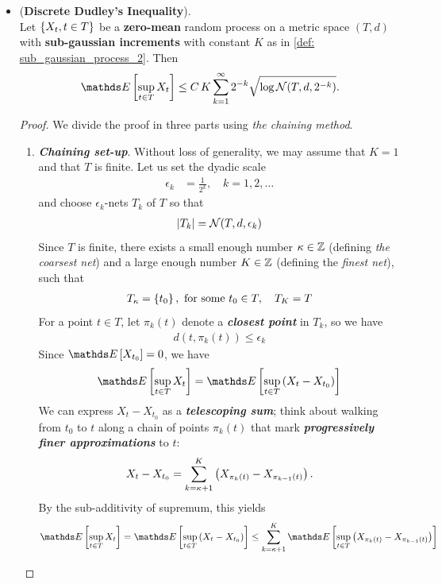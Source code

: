 \documentclass[11pt]{article}
\begin{document}
\begin{itemize}
\item \begin{theorem} (\textbf{Discrete Dudley's Inequality}). \citep{vershynin2018high}\\
Let $\left\{X_{t}, t \in T\right\}$ be a \textbf{zero-mean} random process on a metric space $(T, d)$ with \textbf{sub-gaussian increments} with constant $K$ as in \eqref{def: sub_gaussian_process_2}.
Then
\begin{align}
\E{}{\sup_{t\in T}X_t } \le C\,K \sum_{k=1}^{\infty}2^{-k}\sqrt{\log \cN(T, d, 2^{-k})}. \label{ineqn: dudley_metric_entropy_integral_inequality_discrete}
\end{align}
\end{theorem}
\begin{proof}
We divide the proof in three parts using \emph{the chaining method}.
\begin{enumerate}
\item \emph{\textbf{Chaining set-up}}. Without loss of generality, we may assume that $K = 1$ and that $T$ is finite. Let us set the dyadic
scale
\begin{align*}
\epsilon_k &= \frac{1}{2^k}, \quad k=1, 2, \ldots
\end{align*} and choose $\epsilon_k$-nets $T_k$ of $T$ so that
\begin{align}
\left\lvert T_k \right\rvert = {\mathcal N}(T, d, \epsilon_k) \label{pf: dudley_discrete_eps_net_setup}
\end{align} Since $T$ is finite, there exists a small enough number $\kappa \in {\mathbb Z}$ (defining \emph{the coarsest net}) and a large enough number $K \in {\mathbb Z}$ (defining the \emph{finest net}), such that
\begin{align*}
 T_\kappa= \left\{t_0\right\}, \text{ for some } t_0 \in T, \quad T_K = T
\end{align*} For a point $t \in T$, let $\pi_k(t)$ denote a \emph{\textbf{closest point}} in $T_k$, so we have
\begin{align}
d(t, \pi_k(t)) \le \epsilon_k  \label{pf: dudley_discrete_eps_net_dist}
\end{align} Since $\E{}{X_{t_0}} = 0$, we have
\begin{align*}
\E{}{\sup_{t\in T}X_t} = \E{}{\sup_{t\in T}\paren{X_t - X_{t_0}}}
\end{align*}  We can express $X_t - X_{t_0}$ as a \emph{\textbf{telescoping sum}}; think about walking from $t_0$ to $t$ along a chain of points $\pi_k(t)$ that mark \emph{\textbf{progressively finer approximations}} to $t$:
\begin{align*}
X_t - X_{t_0} = \sum_{k=\kappa+1}^{K}\left(X_{\pi_k(t)} - X_{\pi_{k-1}(t)}\right).
\end{align*} By the sub-additivity of supremum, this yields
\begin{align}
\E{}{\sup_{t\in T}X_t} = \E{}{\sup_{t\in T}\paren{X_t - X_{t_0}}} \le \sum_{k=\kappa+1}^{K} \E{}{\sup_{t\in T}\paren{X_{\pi_k(t)} - X_{\pi_{k-1}(t)}}} \label{pf: chaining_argument_subadditivity}
\end{align} 


\end{enumerate}
\end{proof}
\end{itemize}
\end{document}
